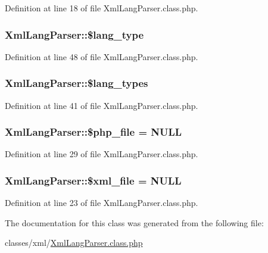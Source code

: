 Definition at line 18 of file Xml\-Lang\-Parser.\-class.\-php.

\hypertarget{classXmlLangParser_ac1289e1d349c8e40ef4afd26941cba5d}{
\subsubsection[{\$lang\-\_\-type}]{\setlength{\rightskip}{0pt plus 5cm}Xml\-Lang\-Parser\-::\$lang\-\_\-type}}\label{classXmlLangParser_ac1289e1d349c8e40ef4afd26941cba5d}


Definition at line 48 of file Xml\-Lang\-Parser.\-class.\-php.

\hypertarget{classXmlLangParser_a0385e815b92b65f3b3d12a29e54d1e36}{
\subsubsection[{\$lang\-\_\-types}]{\setlength{\rightskip}{0pt plus 5cm}Xml\-Lang\-Parser\-::\$lang\-\_\-types}}\label{classXmlLangParser_a0385e815b92b65f3b3d12a29e54d1e36}


Definition at line 41 of file Xml\-Lang\-Parser.\-class.\-php.

\hypertarget{classXmlLangParser_a0f8639ef765df04b8c4e7903de4353bb}{
\subsubsection[{\$php\-\_\-file}]{\setlength{\rightskip}{0pt plus 5cm}Xml\-Lang\-Parser\-::\$php\-\_\-file = N\-U\-L\-L}}\label{classXmlLangParser_a0f8639ef765df04b8c4e7903de4353bb}


Definition at line 29 of file Xml\-Lang\-Parser.\-class.\-php.

\hypertarget{classXmlLangParser_a95de36282488ee37a0ef18ef85a6697c}{
\subsubsection[{\$xml\-\_\-file}]{\setlength{\rightskip}{0pt plus 5cm}Xml\-Lang\-Parser\-::\$xml\-\_\-file = N\-U\-L\-L}}\label{classXmlLangParser_a95de36282488ee37a0ef18ef85a6697c}


Definition at line 23 of file Xml\-Lang\-Parser.\-class.\-php.



The documentation for this class was generated from the following file\-:\begin{DoxyCompactItemize}
\item 
classes/xml/\hyperlink{XmlLangParser_8class_8php}{Xml\-Lang\-Parser.\-class.\-php}\end{DoxyCompactItemize}
